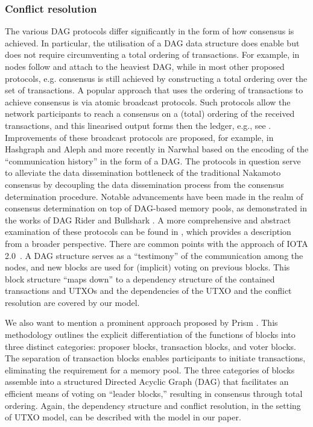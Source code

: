 \documentclass[11pt]{article}
\theoremstyle{plain}
\theoremstyle{definition}
\numberwithin{definition}{section}
\numberwithin{lemma}{section}
\numberwithin{ass}{section}
\numberwithin{remark}{section}
\numberwithin{example}{section}
\numberwithin{proposition}{section}
\numberwithin{theorem}{section}
\begin{document}
\subsubsection{Conflict resolution}
The various DAG protocols differ significantly in the form of how consensus is achieved. In particular, the utilisation of a  DAG data structure does enable but does not require circumventing a total ordering of transactions. For example, in \cite{popov2015} nodes follow and attach to the heaviest DAG, while in most other proposed protocols, e.g. \cite{PHANTOM,lewenberg2015inclusive,Gagol2019, Li2020GHASTBC, OHIE, Prism, DAGRider, Bullshark} consensus is still achieved by constructing a total ordering over the set of transactions. A popular approach that uses the ordering of transactions to achieve consensus is via atomic broadcast protocols. Such protocols allow the network participants to reach a consensus on a (total) ordering of the received transactions, and this linearised output forms then the ledger, e.g., see \cite{HoneyBadger, BEAT}. Improvements of these broadcast protocols are proposed, for example, in  Hashgraph \cite{Hashgraph} and Aleph \cite{Gagol2019} and more recently in Narwhal \cite{Narwhal22} based on the encoding of the ``communication history'' in the form of a DAG. 
The protocols in question serve to alleviate the data dissemination bottleneck of the traditional Nakamoto consensus by decoupling the data dissemination process from the consensus determination procedure. Notable advancements have been made in the realm of consensus determination on top of DAG-based memory pools, as demonstrated in the works of DAG Rider \cite{DAGRider} and Bullshark \cite{Bullshark}. A more comprehensive and abstract examination of these protocols can be found in \cite{BlockDAG}, which provides a description from a broader perspective. There are common points with the approach of IOTA 2.0~\cite{OTV}. A DAG structure serves as a ``testimony'' of the communication among the nodes, and new blocks are used for (implicit) voting on previous blocks. This block structure ``maps down'' to a dependency structure of the contained transactions and UTXOs and the dependencies of the UTXO and the conflict resolution are covered by our model.

{We also want to mention a prominent approach proposed by Prism \cite{Prism}. This methodology outlines the explicit differentiation of the functions of blocks into three distinct categories: proposer blocks, transaction blocks, and voter blocks. The separation of transaction blocks enables participants to initiate transactions, eliminating the requirement for a memory pool. The three categories of blocks assemble into a structured Directed Acyclic Graph (DAG) that facilitates an efficient means of voting on ``leader blocks,'' resulting in consensus through total ordering. Again, the dependency structure and conflict resolution, in the setting of UTXO model, can be described with the model in our paper. }
\end{document}
